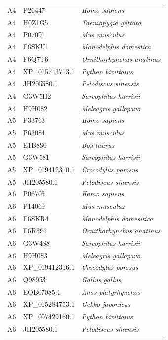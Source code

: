 \begin{table}[h!]
\begin{tabular}{lll}
{\footnotesize{}A4} & {\footnotesize{}P26447} & \emph{\footnotesize{}Homo sapiens}\tabularnewline
{\footnotesize{}A4} & {\footnotesize{}H0Z1G5} & \emph{\footnotesize{}Taeniopygia guttata }\tabularnewline
{\footnotesize{}A4} & {\footnotesize{}P07091} & \emph{\footnotesize{}Mus musculus}\tabularnewline
{\footnotesize{}A4} & {\footnotesize{}F6SKU1} & \emph{\footnotesize{}Monodelphis domestica}\tabularnewline
{\footnotesize{}A4} & {\footnotesize{}F6Q7T6} & \emph{\footnotesize{}Ornithorhynchus anatinus}\tabularnewline
{\footnotesize{}A4} & {\footnotesize{}XP\_015743713.1} & \emph{\footnotesize{}Python bivittatus}\tabularnewline
{\footnotesize{}A4} & {\footnotesize{}JH205580.1} & \emph{\footnotesize{}Pelodiscus sinensis}\tabularnewline
{\footnotesize{}A4} & {\footnotesize{}G3W5H2} & \emph{\footnotesize{}Sarcophilus harrisii}\tabularnewline
{\footnotesize{}A4} & {\footnotesize{}H9H0S2} & \emph{\footnotesize{}Meleagris gallopavo}\tabularnewline
{\footnotesize{}A5} & {\footnotesize{}P33763} & \emph{\footnotesize{}Homo sapiens}\tabularnewline
{\footnotesize{}A5} & {\footnotesize{}P63084} & \emph{\footnotesize{}Mus musculus}\tabularnewline
{\footnotesize{}A5} & {\footnotesize{}E1B8S0} & \emph{\footnotesize{}Bos taurus}\tabularnewline
{\footnotesize{}A5} & {\footnotesize{}G3W581} & \emph{\footnotesize{}Sarcophilus harrisii}\tabularnewline
{\footnotesize{}A5} & {\footnotesize{}XP\_019412310.1} & \emph{\footnotesize{}Crocodylus porosus}\tabularnewline
{\footnotesize{}A5} & {\footnotesize{}JH205580.1} & \emph{\footnotesize{}Pelodiscus sinensis}\tabularnewline
{\footnotesize{}A6} & {\footnotesize{}P06703} & \emph{\footnotesize{}Homo sapiens}\tabularnewline
{\footnotesize{}A6} & {\footnotesize{}P14069} & \emph{\footnotesize{}Mus musculus}\tabularnewline
{\footnotesize{}A6} & {\footnotesize{}F6SKR4} & \emph{\footnotesize{}Monodelphis domesitica}\tabularnewline
{\footnotesize{}A6} & {\footnotesize{}F6R394} & \emph{\footnotesize{}Ornithorhynchus anatinus}\tabularnewline
{\footnotesize{}A6} & {\footnotesize{}G3W4S8} & \emph{\footnotesize{}Sarcophilus harrisii}\tabularnewline
{\footnotesize{}A6} & {\footnotesize{}H9H0S3} & \emph{\footnotesize{}Meleagris gallopavo}\tabularnewline
{\footnotesize{}A6} & {\footnotesize{}XP\_019412316.1} & \emph{\footnotesize{}Crocodylus porosus}\tabularnewline
{\footnotesize{}A6} & {\footnotesize{}Q98953} & \emph{\footnotesize{}Gallus gallus}\tabularnewline
{\footnotesize{}A6} & {\footnotesize{}EOB07085.1} & \emph{\footnotesize{}Anas platyrhynchos}\tabularnewline
{\footnotesize{}A6} & {\footnotesize{}XP\_015284753.1} & \emph{\footnotesize{}Gekko japonicus}\tabularnewline
{\footnotesize{}A6} & {\footnotesize{}XP\_007429160.1} & \emph{\footnotesize{}Python bivittatus}\tabularnewline
{\footnotesize{}A6} & {\footnotesize{}JH205580.1} & \emph{\footnotesize{}Pelodiscus sinensis}\tabularnewline
\end{tabular}
\end{table}





